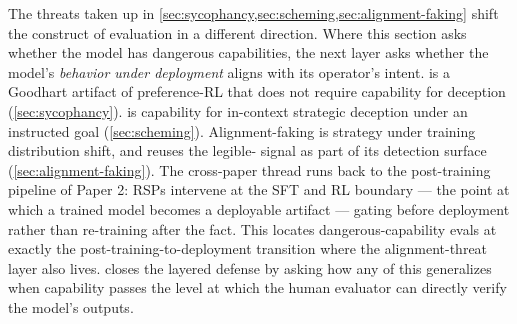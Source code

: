 The threats taken up in
\cref{sec:sycophancy,sec:scheming,sec:alignment-faking} shift the
construct of evaluation in a different direction. Where this section
asks whether the model has dangerous capabilities, the next layer
asks whether the model's \emph{behavior under deployment} aligns
with its operator's intent.  is a Goodhart artifact of
preference-RL that does not require capability for deception
(\cref{sec:sycophancy}).  is capability for in-context
strategic deception under an instructed goal
(\cref{sec:scheming}). Alignment-faking is strategy under training
distribution shift, and reuses the legible- signal as part of its
detection surface (\cref{sec:alignment-faking}). The cross-paper
thread runs back to the post-training pipeline of Paper 2: RSPs
intervene at the SFT and RL boundary --- the point at which a
trained model becomes a deployable artifact --- gating before
deployment rather than re-training after the fact. This locates
dangerous-capability evals at exactly the post-training-to-deployment
transition where the alignment-threat layer also lives.
 closes the layered defense by asking
how any of this generalizes when capability passes the level at which
the human evaluator can directly verify the model's outputs.
